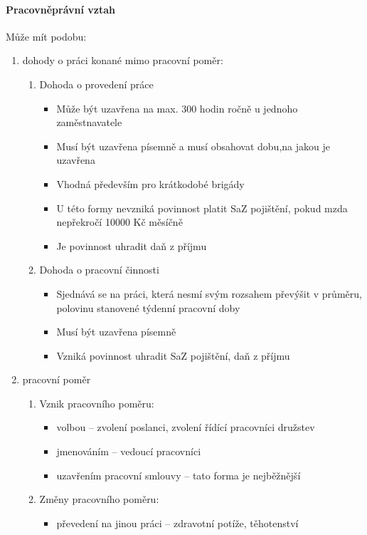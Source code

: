 \documentclass[11pt,a4paper,twoside]{book}
\begin{document}
	\paragraph*{Pracovněprávní vztah}
	Může mít podobu:
	\begin{enumerate}
		\item dohody o práci konané mimo pracovní poměr:
			\begin{enumerate}
				\item Dohoda o provedení práce
					\begin{itemize} 
						\item Může být uzavřena na max. 300 hodin ročně u jednoho zaměstnavatele
						\item Musí být uzavřena písemně a musí obsahovat dobu,na jakou je uzavřena
						\item Vhodná především pro krátkodobé brigády
						\item U této formy nevzniká povinnost platit SaZ pojištění, pokud mzda nepřekročí 10000 Kč měsíčně
						\item Je povinnost uhradit daň z příjmu
					\end{itemize}
				\item Dohoda o pracovní činnosti
					\begin{itemize}
						\item Sjednává se na práci, která nesmí svým rozsahem převýšit v průměru, polovinu stanovené týdenní pracovní doby
						\item Musí být uzavřena písemně
						\item Vzniká povinnost uhradit SaZ pojištění, daň z příjmu
					\end{itemize}
			\end{enumerate}
		\item pracovní poměr
			\begin{enumerate}
				\item Vznik pracovního poměru:
					\begin{itemize}
						\item volbou -- zvolení poslanci, zvolení řídící pracovníci družstev
						\item jmenováním -- vedoucí pracovníci
						\item uzavřením pracovní smlouvy -- tato forma je nejběžnější
					\end{itemize}
				\item Změny pracovního poměru:
					\begin{itemize}
						\item převedení na jinou práci -- zdravotní potíže, těhotenství

\end{itemize}
\end{enumerate}
\end{enumerate}
\end{document}
